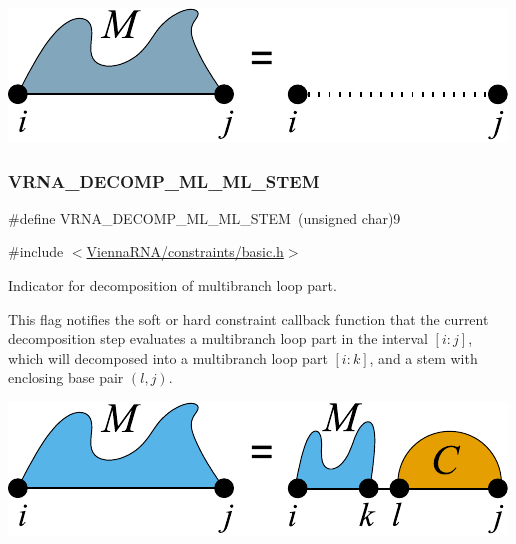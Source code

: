  
\begin{DoxyImageNoCaption}
  \mbox{\includegraphics[width=\textwidth,height=\textheight/2,keepaspectratio=true]{decomp_ml_up}}
\end{DoxyImageNoCaption}
 \mbox{\label{group__constraints_ga63d8ceb8c96ae3b463e529e28cc0fe98}} 
\subsubsection{\texorpdfstring{VRNA\_DECOMP\_ML\_ML\_STEM}{VRNA\_DECOMP\_ML\_ML\_STEM}}
{\footnotesize\ttfamily \#define V\+R\+N\+A\+\_\+\+D\+E\+C\+O\+M\+P\+\_\+\+M\+L\+\_\+\+M\+L\+\_\+\+S\+T\+EM~(unsigned char)9}



{\ttfamily \#include $<$\mbox{\hyperlink{constraints_2basic_8h}{Vienna\+R\+N\+A/constraints/basic.\+h}}$>$}



Indicator for decomposition of multibranch loop part. 

This flag notifies the soft or hard constraint callback function that the current decomposition step evaluates a multibranch loop part in the interval $[i:j]$, which will decomposed into a multibranch loop part $[i:k]$, and a stem with enclosing base pair $(l,j)$.

 
\begin{DoxyImageNoCaption}
  \mbox{\includegraphics[width=\textwidth,height=\textheight/2,keepaspectratio=true]{decomp_ml_ml_stem}}
\end{DoxyImageNoCaption}
 \mbox{\label{group__constraints_ga4fe48d575830b16c208e280e01ab1497}} 
